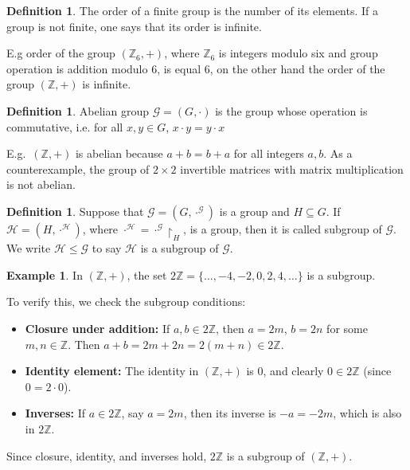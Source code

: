\documentclass{pracalicmgr2025}
\theoremstyle{plain}            %
\theoremstyle{remark}           %
\theoremstyle{definition}       %
\newtheorem{example}[theorem]{Example}
\newtheorem{definition}[theorem]{Definition}
\begin{document}
\begin{definition}
    The order of a finite group is the number of its elements. If a group is not finite, one says that its order is infinite.
\end{definition}

    E.g order of the group $(\mathbb{Z}_6, +)$, where $\mathbb{Z}_6$ is integers modulo six and group operation is addition modulo $6$, is equal $6$, on the other hand the order of the group $(\mathbb{Z}, +)$ is infinite.
\begin{definition}
     Abelian group $\mathcal{G} = (G, \cdot)$ is the group whose operation is commutative, i.e. for all $x,y \in G$, $x\cdot y = y \cdot x$
\end{definition}

 E.g.\ $(\mathbb{Z},+)$ is abelian because $a+b=b+a$ for all integers $a,b$. As a counterexample, the group of $2\times 2$ invertible matrices with matrix multiplication is not abelian.


\begin{definition}
    Suppose that $\mathcal{G} = (G, \cdot^\mathcal{G})$ is a group and $H \subseteq G$. If $\mathcal{H} = (H,\cdot^\mathcal{H})$, where $\cdot ^ \mathcal{H} = \cdot ^\mathcal{G} \upharpoonright_H $, is a group, then it is called subgroup of $\mathcal{G}$. We write $\mathcal{H} \le \mathcal{G}$ to say $\mathcal{H}$ is a subgroup of $\mathcal{G}$.
\end{definition}
\begin{example}
In $(\mathbb{Z},+)$, the set $2\mathbb{Z} = \{ \dots,-4,-2,0,2,4,\dots\}$ is a subgroup.  

To verify this, we check the subgroup conditions:  

\begin{itemize}
    \item \textbf{Closure under addition:}  
    If $a, b \in 2\mathbb{Z}$, then $a = 2m$, $b = 2n$ for some $m,n \in \mathbb{Z}$.  
    Then $a+b = 2m+2n = 2(m+n) \in 2\mathbb{Z}$.  

    \item \textbf{Identity element:}  
    The identity in $(\mathbb{Z},+)$ is $0$, and clearly $0 \in 2\mathbb{Z}$ (since $0=2\cdot 0$).  

    \item \textbf{Inverses:}  
    If $a \in 2\mathbb{Z}$, say $a=2m$, then its inverse is $-a=-2m$, which is also in $2\mathbb{Z}$.  
\end{itemize}

Since closure, identity, and inverses hold, $2\mathbb{Z}$ is a subgroup of $(\mathbb{Z},+)$.
\end{example}
\end{document}
